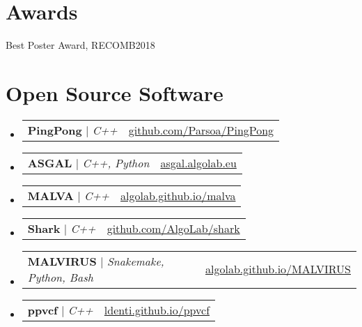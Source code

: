 \documentclass[letterpaper,11pt]{article}
\makeatletter
\newcommand{\resumeProjectHeading}[2]{
    \item
    \begin{tabular*}{0.97\textwidth}{l@{\extracolsep{\fill}}r}
      \small#1 & #2 \\
    \end{tabular*}\vspace{-7pt}
}
\newcommand{\resumeSubHeadingListStart}{\begin{itemize}[leftmargin=0.15in, label={}]}
\newcommand{\resumeSubHeadingListEnd}{\end{itemize}}
\makeatother
\begin{document}
\section{Awards}
 \begin{itemize}
    \small{
        \item Best Poster Award, RECOMB2018
    }
 \end{itemize}
 
\section{Open Source Software}
    \resumeSubHeadingListStart
      \resumeProjectHeading {\textbf{PingPong} $|$ \emph{C++}}{\href{https://github.com/Parsoa/PingPong}{github.com/Parsoa/PingPong}}
      \resumeProjectHeading {\textbf{ASGAL} $|$ \emph{C++, Python}}{\href{https://asgal.algolab.eu/}{asgal.algolab.eu}}
      \resumeProjectHeading {\textbf{MALVA} $|$ \emph{C++}}{\href{https://algolab.github.io/malva/}{algolab.github.io/malva}}
      \resumeProjectHeading {\textbf{Shark} $|$ \emph{C++}}{\href{https://github.com/AlgoLab/shark}{github.com/AlgoLab/shark}}
      \resumeProjectHeading {\textbf{MALVIRUS} $|$ \emph{Snakemake, Python, Bash}}{\href{https://algolab.github.io/MALVIRUS/}{algolab.github.io/MALVIRUS}}
      \resumeProjectHeading {\textbf{ppvcf} $|$ \emph{C++}}{\href{https://ldenti.github.io/ppvcf/}{ldenti.github.io/ppvcf}}
    \resumeSubHeadingListEnd
\end{document}
